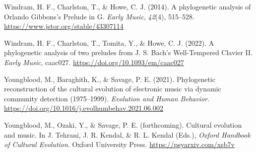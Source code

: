 \documentclass[
  a4paperpaper,
  ,captions=tableheading
]{scrbook}
\newlength{\cslhangindent}
\newlength{\cslentryspacingunit} %
\newenvironment{CSLReferences}[2] %
 {%
  \setlength{\parindent}{0pt}
  \ifodd #1
  \let\oldpar\par
  \def\par{\hangindent=\cslhangindent\oldpar}
  \fi
  \setlength{\parskip}{#2\cslentryspacingunit}
 }%
 {}
\begin{document}
\begin{CSLReferences}{1}{0}
\leavevmode{}%
Windram, H. F., Charlston, T., \& Howe, C. J. (2014). A phylogenetic
analysis of {Orlando Gibbons}'s {Prelude} in {G}. \emph{Early Music},
\emph{42}(4), 515--528. \url{https://www.jstor.org/stable/43307114}

\leavevmode{}%
Windram, H. F., Charlston, T., Tomita, Y., \& Howe, C. J. (2022). A
phylogenetic analysis of two preludes from {J}. {S}. {Bach}'s
{Well-Tempered Clavier II}. \emph{Early Music}, caac027.
\url{https://doi.org/10.1093/em/caac027}

\leavevmode{}%
Youngblood, M., Baraghith, K., \& Savage, P. E. (2021). Phylogenetic
reconstruction of the cultural evolution of electronic music via dynamic
community detection (1975--1999). \emph{Evolution and Human Behavior}.
\url{https://doi.org/10.1016/j.evolhumbehav.2021.06.002}

\leavevmode{}%
Youngblood, M., Ozaki, Y., \& Savage, P. E. (forthcoming). Cultural
evolution and music. In J. Tehrani, J. R. Kendal, \& R. L. Kendal
(Eds.), \emph{{Oxford Handbook of Cultural Evolution}}. Oxford
University Press. \url{https://psyarxiv.com/xsb7v}

\end{CSLReferences}
\end{document}

